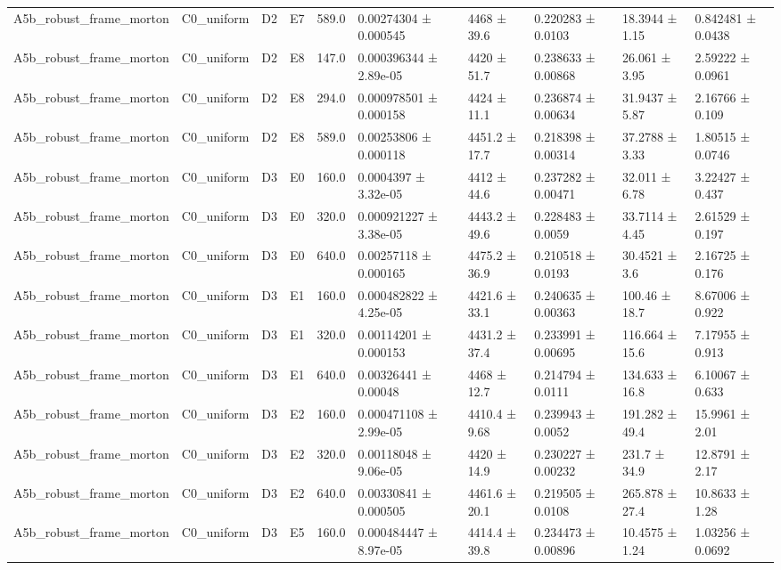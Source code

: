 \begin{table}
\begin{tabular}{llllllllll}
A5b\_robust\_frame\_morton & C0\_uniform & D2 & E7 & 589.0 & 0.00274304 ± 0.000545 & 4468 ± 39.6 & 0.220283 ± 0.0103 & 18.3944 ± 1.15 & 0.842481 ± 0.0438 \\
A5b\_robust\_frame\_morton & C0\_uniform & D2 & E8 & 147.0 & 0.000396344 ± 2.89e-05 & 4420 ± 51.7 & 0.238633 ± 0.00868 & 26.061 ± 3.95 & 2.59222 ± 0.0961 \\
A5b\_robust\_frame\_morton & C0\_uniform & D2 & E8 & 294.0 & 0.000978501 ± 0.000158 & 4424 ± 11.1 & 0.236874 ± 0.00634 & 31.9437 ± 5.87 & 2.16766 ± 0.109 \\
A5b\_robust\_frame\_morton & C0\_uniform & D2 & E8 & 589.0 & 0.00253806 ± 0.000118 & 4451.2 ± 17.7 & 0.218398 ± 0.00314 & 37.2788 ± 3.33 & 1.80515 ± 0.0746 \\
A5b\_robust\_frame\_morton & C0\_uniform & D3 & E0 & 160.0 & 0.0004397 ± 3.32e-05 & 4412 ± 44.6 & 0.237282 ± 0.00471 & 32.011 ± 6.78 & 3.22427 ± 0.437 \\
A5b\_robust\_frame\_morton & C0\_uniform & D3 & E0 & 320.0 & 0.000921227 ± 3.38e-05 & 4443.2 ± 49.6 & 0.228483 ± 0.0059 & 33.7114 ± 4.45 & 2.61529 ± 0.197 \\
A5b\_robust\_frame\_morton & C0\_uniform & D3 & E0 & 640.0 & 0.00257118 ± 0.000165 & 4475.2 ± 36.9 & 0.210518 ± 0.0193 & 30.4521 ± 3.6 & 2.16725 ± 0.176 \\
A5b\_robust\_frame\_morton & C0\_uniform & D3 & E1 & 160.0 & 0.000482822 ± 4.25e-05 & 4421.6 ± 33.1 & 0.240635 ± 0.00363 & 100.46 ± 18.7 & 8.67006 ± 0.922 \\
A5b\_robust\_frame\_morton & C0\_uniform & D3 & E1 & 320.0 & 0.00114201 ± 0.000153 & 4431.2 ± 37.4 & 0.233991 ± 0.00695 & 116.664 ± 15.6 & 7.17955 ± 0.913 \\
A5b\_robust\_frame\_morton & C0\_uniform & D3 & E1 & 640.0 & 0.00326441 ± 0.00048 & 4468 ± 12.7 & 0.214794 ± 0.0111 & 134.633 ± 16.8 & 6.10067 ± 0.633 \\
A5b\_robust\_frame\_morton & C0\_uniform & D3 & E2 & 160.0 & 0.000471108 ± 2.99e-05 & 4410.4 ± 9.68 & 0.239943 ± 0.0052 & 191.282 ± 49.4 & 15.9961 ± 2.01 \\
A5b\_robust\_frame\_morton & C0\_uniform & D3 & E2 & 320.0 & 0.00118048 ± 9.06e-05 & 4420 ± 14.9 & 0.230227 ± 0.00232 & 231.7 ± 34.9 & 12.8791 ± 2.17 \\
A5b\_robust\_frame\_morton & C0\_uniform & D3 & E2 & 640.0 & 0.00330841 ± 0.000505 & 4461.6 ± 20.1 & 0.219505 ± 0.0108 & 265.878 ± 27.4 & 10.8633 ± 1.28 \\
A5b\_robust\_frame\_morton & C0\_uniform & D3 & E5 & 160.0 & 0.000484447 ± 8.97e-05 & 4414.4 ± 39.8 & 0.234473 ± 0.00896 & 10.4575 ± 1.24 & 1.03256 ± 0.0692 \\

\end{tabular}
\end{table}
